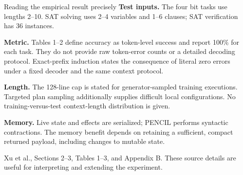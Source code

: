 \documentclass[11pt,aspectratio=169]{beamer}
\newcommand{\source}[1]{\par\vfill{\scriptsize\color{muted}#1\par}}
\begin{document}
\begin{frame}{Reading the empirical result precisely}
\small
\textbf{Test inputs.} The four bit tasks use lengths 2--10. SAT solving uses
2--4 variables and 1--6 clauses; SAT verification has 36 instances.

\textbf{Metric.} Tables 1--2 define accuracy as token-level success and report
100\% for each task. They do not provide raw token-error counts or a detailed
decoding protocol. Exact-prefix induction states the consequence of literal
zero errors under a fixed decoder and the same context protocol.

\textbf{Length.} The 128-line cap is stated for generator-sampled training
executions. Targeted plan sampling additionally supplies difficult local
configurations. No training-versus-test context-length distribution is given.

\textbf{Memory.} Live state and effects are serialized; PENCIL performs syntactic
contractions. The memory benefit depends on retaining a sufficient, compact
returned payload, including changes to mutable state.

\source{Xu et al., Sections 2--3, Tables 1--3, and Appendix B. These source
details are useful for interpreting and extending the experiment.}
\end{frame}
\end{document}

